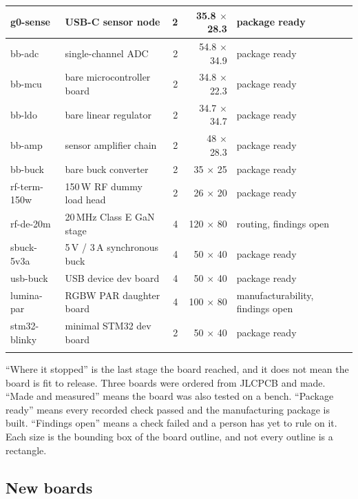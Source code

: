 \begin{hsblock}
\begin{tabularx}{\linewidth}{@{}l Y r r >{\raggedright\arraybackslash}p{3.3cm}@{}}
g0-sense & USB-C sensor node & 2 & 35.8 $\times$ 28.3 & package ready\\\hline
bb-adc & single-channel ADC & 2 & 54.8 $\times$ 34.9 & package ready\\\hline
bb-mcu & bare microcontroller board & 2 & 34.8 $\times$ 22.3 & package ready\\\hline
bb-ldo & bare linear regulator & 2 & 34.7 $\times$ 34.7 & package ready\\\hline
bb-amp & sensor amplifier chain & 2 & 48 $\times$ 28.3 & package ready\\\hline
bb-buck & bare buck converter & 2 & 35 $\times$ 25 & package ready\\\hline
rf-term-150w & 150\,W RF dummy load head & 2 & 26 $\times$ 20 & package ready\\\hline
rf-de-20m & 20\,MHz Class E GaN stage & 4 & 120 $\times$ 80 & routing, findings open\\\hline
sbuck-5v3a & 5\,V / 3\,A synchronous buck & 4 & 50 $\times$ 40 & package ready\\\hline
usb-buck & USB device dev board & 4 & 50 $\times$ 40 & package ready\\\hline
lumina-par & RGBW PAR daughter board & 4 & 100 $\times$ 80 & manufacturability, findings open\\\hline
stm32-blinky & minimal STM32 dev board & 2 & 50 $\times$ 40 & package ready\\
\hstoprule
\end{tabularx}
\end{hsblock}

``Where it stopped'' is the last stage the board reached, and it does not mean
the board is fit to release. Three boards were ordered from JLCPCB and made.
``Made and measured'' means the board was also tested on a bench. ``Package
ready'' means every recorded check passed and the manufacturing package is
built. ``Findings open'' means a check failed and a person has yet to rule on
it. Each size is the bounding box of the board outline, and not every outline
is a rectangle.

\newpage

\subsection{New boards}

